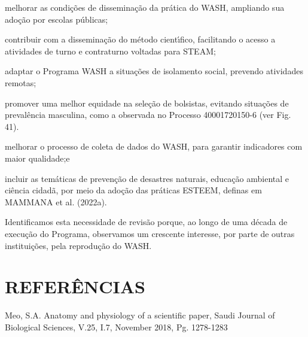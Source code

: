 \documentclass[
12pt,		%
openright,	%
twoside,  %
a4paper,			%
chapter=TITLE,		%
english,			%
french,				%
spanish,			%
brazil				%
]{USPSC-classe/USPSC}
\begin{document}
\begin{alineas}
\item melhorar as condi\c{c}\~oes de dissemina\c{c}\~ao da pr\'atica do WASH, ampliando sua ado\c{c}\~ao por escolas p\'ublicas;
\item contribuir com a dissemina\c{c}\~ao do m\'etodo cient\'{\i}fico, facilitando o acesso a atividades de turno e contraturno voltadas para STEAM;
\item adaptar o Programa WASH a situa\c{c}\~oes de isolamento social, prevendo atividades remotas;
\item promover uma melhor equidade na sele\c{c}\~ao de bolsistas, evitando situa\c{c}\~oes de preval\^encia masculina, como a observada no Processo 40001720150-6 (ver Fig. 41).
\item melhorar o processo de coleta de dados do WASH, para garantir indicadores com maior qualidade;e
\item incluir as tem\'aticas de preven\c{c}\~ao de desastres naturais, educa\c{c}\~ao ambiental e ci\^encia cidad\~a, por meio da ado\c{c}\~ao das pr\'aticas ESTEEM, definas em  MAMMANA et al. (2022a).
\end{alineas}

Identificamos esta necessidade de revis\~ao porque, ao longo de uma d\'ecada de execu\c{c}\~ao do Programa, observamos um crescente interesse, por parte de outras institui\c{c}\~oes, pela reprodu\c{c}\~ao do WASH.








\chapter[REFER\^ENCIAS]{REFER\^ENCIAS}\label{REFER\^ENCIAS}
\begin{flushleft}
\begin{flushleft}
\begin{flushleft}
\begin{flushleft}
\begin{flushleft}
\begin{flushleft}
\begin{flushleft}
\begin{flushleft}
[MEO, 2018] Meo, S.A. Anatomy and physiology of a scientific paper, Saudi Journal of Biological Sciences, V.25, I.7, November 2018, Pg. 1278-1283
\end{flushleft}


\end{flushleft}


\end{flushleft}


\end{flushleft}


\end{flushleft}


\end{flushleft}


\end{flushleft}


\end{flushleft}
\end{document}
